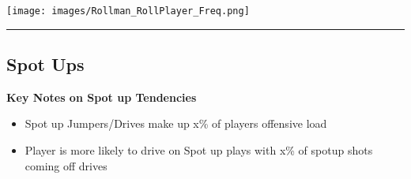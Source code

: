 \documentclass[a4paper,12pt]{article}
\begin{document}
\begin{table}[H]
{\begin{minipage}[t]{0.6\textwidth}
{\begin{tabular}
                
            
                
            
                
            
                
            
                
            
                
            
                
            
                
            
                
                    
                
            

            \bottomrule
        \end{tabular}
        } %
    \end{minipage}
    } %
    \hfill %
    \begin{minipage}[c]{0.35\textwidth} %
        \flushright
        \texttt{[image: images/Rollman\_RollPlayer\_Freq.png]} %
    \end{minipage}
\end{table}

\vspace{-1em} %
\hrule height 1pt width 1\textwidth %
\vspace{1em} %

\clearpage

\subsection{Spot Ups}

\vspace{1.25em} %
\textbf{Key Notes on Spot up Tendencies}
\vspace{0.5em} %

\begin{itemize}
    \item Spot up Jumpers/Drives make up x\% of players offensive load
    \vspace{0.3em} %
    \item Player is more likely to drive on Spot up plays with x\% of spotup shots coming off drives
\end{itemize}
\end{document}
